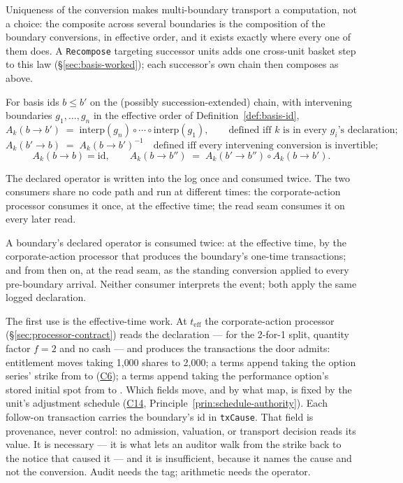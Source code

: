 Uniqueness of the conversion makes multi-boundary transport a computation, not a
choice: the composite across several boundaries is the composition of the boundary
conversions, in effective order, and it exists exactly where every one of them does.
A \texttt{Recompose} targeting successor units adds one cross-unit basket
step to this law (\S\ref{sec:basis-worked}); each successor's own chain
then composes as above.

\begin{proposition}
\label{prop:composition-law}
For basis ids $b\le b'$ on the (possibly succession-extended) chain, with intervening
boundaries $g_1,\dots,g_n$ in the effective order of Definition~\ref{def:basis-id},
\[
A_k(b\to b') \;=\; \mathrm{interp}(g_n)\circ\cdots\circ\mathrm{interp}(g_1),
\qquad\text{defined iff $k$ is in every $g_i$'s declaration;}
\]
\[
A_k(b'\to b) \;=\; A_k(b\to b')^{-1}
\quad\text{defined iff every intervening conversion is invertible;}
\]
\[
A_k(b\to b)=\mathrm{id},
\qquad
A_k(b\to b'') \;=\; A_k(b'\to b'')\circ A_k(b\to b').
\]
\end{proposition}

The declared operator is written into the log once and consumed twice. The
two consumers share no code path and run at different times: the
corporate-action processor consumes it once, at the effective time; the read
seam consumes it on every later read.

\begin{principle}
\label{prin:one-decl-two-uses}
A boundary's declared operator is consumed twice: at the effective time, by
the corporate-action processor that produces the boundary's one-time
transactions; and from then on, at the read seam, as the standing conversion
applied to every pre-boundary arrival. Neither consumer interprets the event;
both apply the same logged declaration.
\end{principle}

The first use is the effective-time work. At $t_{\mathrm{eff}}$ the
corporate-action processor (\S\ref{sec:processor-contract}) reads the
declaration --- for the 2-for-1 split, quantity factor $f=2$ and no cash ---
and produces the transactions the door admits: entitlement moves taking
1{,}000 shares to 2{,}000; a terms append taking the option series' strike
from  to  (\hyperref[cond:C6]{C6}); a terms append taking the
performance option's stored initial spot from  to . Which
fields move, and by what map, is fixed by the unit's adjustment schedule
(\hyperref[cond:C14]{C14}, Principle~\ref{prin:schedule-authority}). Each
follow-on transaction carries the boundary's id in \texttt{txCause}. That
field is provenance, never control: no admission, valuation, or transport
decision reads its value. It is necessary --- it is what lets an auditor walk
from the  strike back to the notice that caused it --- and it is
insufficient, because it names the cause and not the conversion. Audit needs
the tag; arithmetic needs the operator.

